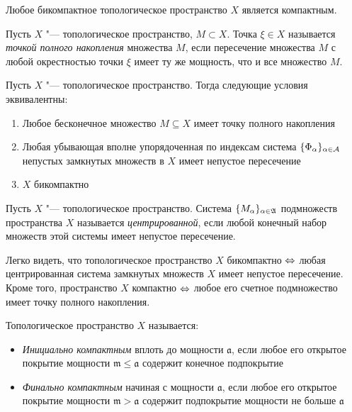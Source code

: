 \begin{corollary}
    Любое бикомпактное топологическое пространство $X$ является компактным.
\end{corollary}

\begin{definition}
    Пусть $X$ "--- топологическое пространство, $M \subset X$. Точка $\xi \in X$ называется \textit{точкой полного накопления} множества $M$, если пересечение множества $M$ с любой окрестностью точки $\xi$ имеет ту же мощность, что и все множество $M$.
\end{definition}

\begin{theorem}
    Пусть $X$ "--- топологическое пространство. Тогда следующие условия эквивалентны:
    \begin{enumerate}
        \item Любое бесконечное множество $M\subseteq X$ имеет точку полного накопления
        
        \item Любая убывающая вполне упорядоченная по индексам система $\{\Phi_\alpha\}_{\alpha \in \mathcal A}$ непустых замкнутых множеств в $X$ имеет непустое пересечение

        \item $X$ бикомпактно
    \end{enumerate}
\end{theorem}

\begin{definition}
    Пусть $X$ "--- топологическое пространство. Система $\{M_\alpha\}_{\alpha \in \mathfrak A}$ подмножеств пространства $X$ называется \textit{центрированной}, если любой конечный набор множеств этой системы имеет непустое пересечение.
\end{definition}

\begin{note}
    Легко видеть, что топологическое пространство $X$ бикомпактно $\Leftrightarrow$ любая центрированная система замкнутых множеств $X$ имеет непустое пересечение. Кроме того, пространство $X$ компактно $\Leftrightarrow$ любое его счетное подмножество имеет точку полного накопления.
\end{note}

\begin{definition}
    Топологическое пространство $X$ называется:
    \begin{itemize}
        \item \textit{Инициально компактным} вплоть до мощности $\mathfrak{a}$, если любое его открытое покрытие мощности $\mathfrak{m} \leq \mathfrak{a}$ содержит конечное подпокрытие

        \item \textit{Финально компактным} начиная с мощности $\mathfrak{a}$, если любое его открытое покрытие мощности $\mathfrak{m} > \mathfrak{a}$ содержит подпокрытие мощности не больше $\mathfrak{a}$
    \end{itemize}    
\end{definition}

